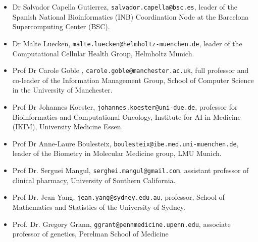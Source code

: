 \documentclass[a4paper]{article}
\begin{document}
\begin{itemize}
    \item Dr Salvador Capella Gutierrez, \texttt{salvador.capella@bsc.es}, leader of the Spanish National Bioinformatics (INB) Coordination Node at the Barcelona Supercomputing Center (BSC).
    \item Dr Malte Luecken, \texttt{malte.luecken@helmholtz-muenchen.de}, leader of the Computational Cellular Health Group, Helmholtz Munich.
    \item Prof Dr Carole Goble , \texttt{carole.goble@manchester.ac.uk}, full professor and co-leader of the Information Management Group, School of Computer Science in the University of Manchester.
    \item Prof Dr Johannes Koester, \texttt{johannes.koester@uni-due.de}, professor for Bioinformatics and Computational Oncology, Institute for AI in Medicine (IKIM), University Medicine Essen.
    \item Prof Dr Anne-Laure Boulesteix, \texttt{boulesteix@ibe.med.uni-muenchen.de}, leader of the Biometry in Molecular Medicine group, LMU Munich.
    \item Prof Dr. Serguei Mangul, \texttt{serghei.mangul@gmail.com}, assistant professor of clinical pharmacy, University of Southern California.
    \item Prof Dr. Jean Yang, \texttt{jean.yang@sydney.edu.au}, professor, School of Mathematics and Statistics of the University of Sydney.
    \item Prof. Dr. Gregory Grann, \texttt{ggrant@pennmedicine.upenn.edu}, associate professor of genetics, Perelman School of Medicine
\end{itemize}
\end{document}
